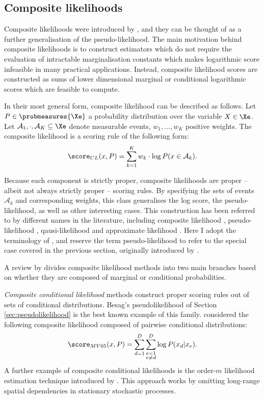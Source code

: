 \cbstart

\subsection{Composite likelihoods\label{sec:composite_likelihood}}

Composite likelihoods were introduced by \citet{Lindsay88}, and they can be thought of as a further generalisation of the pseudo-likelihood. The main motivation behind composite likelihoods is to construct estimators which do not require the evaluation of intractable marginalisation constants which makes logarithmic score infeasible in many practical applications. Instead, composite likelihood scores are constructed as sums of lower dimensional marginal or conditional logarithmic scores which are feasible to compute.

In their most general form, composite likelihood can be described as follows. Let $P\in\probmeasures{\Xe}$ a probability distribution over the variable $X\in\Xe$. Let $\mathcal{A}_1,\cdot,\mathcal{A}_K\subseteq\Xe$ denote measurable events, $w_1,\ldots,w_K$ positive weights. The composite likelihood is a scoring rule of the following form:
%
\begin{equation}
	\score_{CL}(x,P) = \sum_{k=1}^{K} w_k \cdot \log P(x\in\mathcal{A}_k).\label{eqn:composite_likelihood}
\end{equation}

Because each component is strictly proper, composite likelihoods are proper -- albeit not always strictly proper -- scoring rules. By specifying the sets of events $\mathcal{A}_k$ and corresponding weights, this class generalises the log score, the pseudo-likelihood, as well as other interesting cases. This construction has been referred to by different names in the literature, including composite likelihood \citep{Lindsay88,Varin11}, pseudo-likelihood \citep{Molenberghs05}, qausi-likelihood \citep{Hjort94} and approximate likelihood \citep{Stein04}. Here I adopt the terminology of \citet{Lindsay88}, and reserve the term pseudo-likelihood to refer to the special case covered in the previous section, originally introduced by \citet{Besag1977}.

A review by \citet{Varin11} divides composite likelihood methods into two main branches based on whether they are composed of marginal or conditional probabilities.

\emph{Composite conditional likelihood} methods construct proper scoring rules out of sets of conditional distributions. Besag's pseudolikelihood of Section \ref{sec:pseudolikelihood} is the best known example of this family. \citet{Molenberghs05} considered the following composite likelihood composed of pairwise conditional distributions:
%
\begin{equation}
	\score_{MV05}(x,P) = \sum_{d=1}^{D}\sum_{\substack{e=1\\e\neq d}}^{D} \log P(x_d\vert x_e).
\end{equation}
%
A further example of composite conditional likelihoods is the order-$m$ likelihood estimation technique introduced by \citet{Azzalini83}. This approach works by omitting long-range spatial dependencies in stationary stochastic processes.

